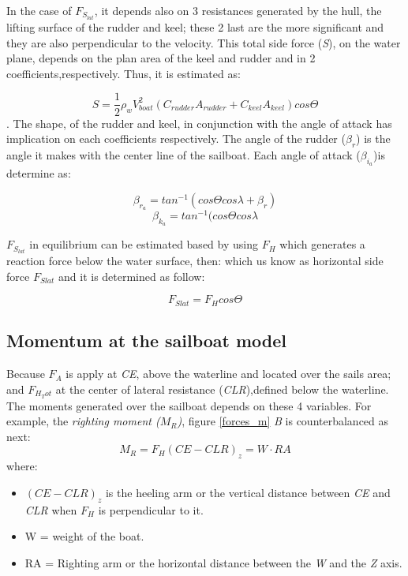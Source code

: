 In the case of $F_{S_{lat}}$, it depends also on 3 resistances generated by the hull, the lifting surface of the rudder and keel; these 2 last are the more significant and they are also perpendicular to the velocity. This total side force (\textit{S}), on the water plane, depends on the plan area of the keel and rudder and in 2 coefficients,respectively.  Thus, it is estimated as: \par 
\begin{equation}
    S=\frac{1}{2} \rho_{w} V_{boat}^2(C_{rudder}A_{rudder}+C_{keel}A_{keel})cos \Theta
\end{equation}.
The shape, of the rudder and keel, in conjunction with the angle of attack has implication on each coefficients respectively. %
The angle of the rudder ($\beta_{r}$) is the angle it makes with the center line of the sailboat. Each angle of attack (\textit{$\beta_{i_{a}}$})is determine as: \par 
\begin{equation}
    \beta_{r_{a}}=tan ^{-1} (cos \Theta cos \lambda + \beta_{r})
\end{equation}
\begin{equation}
    \beta_{k_{a}}=tan ^{-1} (cos \Theta cos \lambda
\end{equation}

$F_{S_{lat}}$ in equilibrium can be estimated based by using $F_{H}$ which generates a reaction force below the water surface, then: %
which us know as horizontal side force $F_{Slat}$ and it is determined as follow: \par
\begin{equation}
    F_{Slat}= F_{H}cos \Theta
\end{equation}
\subsection{Momentum at the sailboat model}
Because $F_{A}$ is apply at \textit{CE}, above the waterline and located over the sails area; and $F_{H_Tot}$ at the center of lateral resistance (\textit{CLR}),defined below the waterline. The moments generated over the sailboat depends on these 4 variables. For example, the \textit{righting moment ($M_{R}$)}, figure \ref{forces_m} \textit{B} is counterbalanced as next: 
\begin{equation}\label{eq:right_mom}
    M_{R}=F_{H}(CE-CLR)_{z}=W \cdot RA
\end{equation}
where:\par
\begin{itemize}
    \item $(CE-CLR)_{z}$ is the heeling arm or the vertical distance between \textit{CE} and \textit{CLR} when $F_{H}$ is perpendicular to it.
    \item W = weight of the boat.
    \item RA = Righting arm or the horizontal distance between the \textit{W} and the \textit{Z} axis.
\end{itemize}

